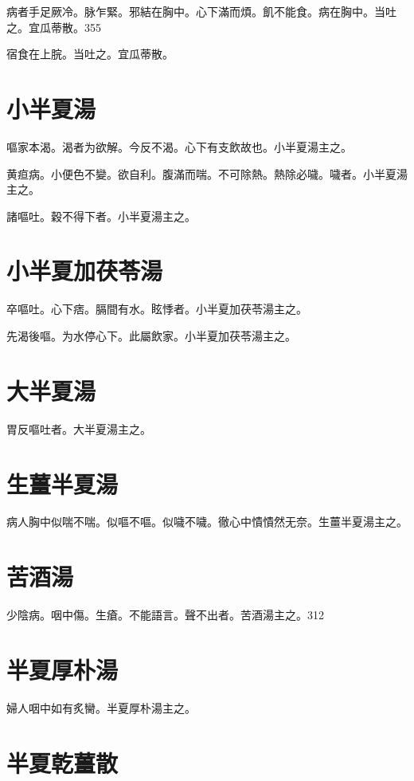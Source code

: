 \documentclass[b5paper,twoside,zihao=-4,UTF8]{ctexbook}
\begin{document}
病者手足厥冷。脉乍緊。邪結在胸中。心下滿而煩。飢不能食。病在胸中。当吐之。宜瓜蒂散。355

宿食在上脘。当吐之。宜瓜蒂散。

\section{小半夏湯}

嘔家本渴。渴者为欲解。今反不渴。心下有支飲故也。小半夏湯主之。

黄疸病。小便色不變。欲自利。腹滿而喘。不可除熱。熱除必噦。噦者。小半夏湯主之。

諸嘔吐。穀不得下者。小半夏湯主之。

\section{小半夏加茯苓湯}

卒嘔吐。心下痞。膈間有水。眩悸者。{小}半夏加茯苓湯主之。

先渴後嘔。为水停心下。此屬飲家。小半夏{加}茯苓湯主之。

\section{大半夏湯}

胃反嘔吐者。大半夏湯主之。

\section{生薑半夏湯}

病人胸中似喘不喘。似嘔不嘔。似噦不噦。徹心中憒憒然无奈。生薑半夏湯主之。

\section{苦酒湯}

少陰病。咽中傷。生瘡。不能語言。聲不出者。苦酒湯主之。312

\section{半夏厚朴湯}

婦人咽中如有炙臠。半夏厚朴湯主之。

\section{半夏乾薑散}
\end{document}
